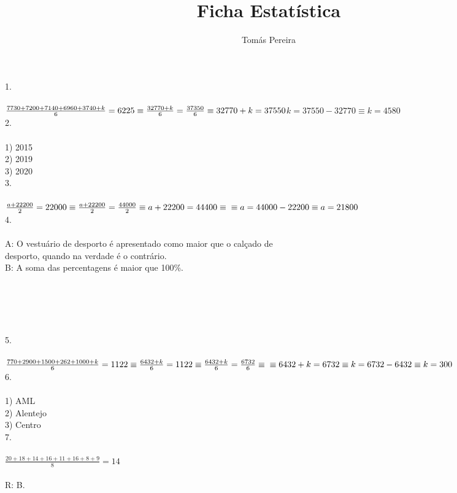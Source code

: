 \documentclass[12pt]{article}
\title{Ficha Estatística}
\author{Tomás Pereira}
\begin{document}
\maketitle

1.\\\\
$\frac{7730+7200+7140+6960+3740+k}{6}=6225\equiv\frac{32770+k}{6}=\frac{37350}{6}\equiv32770+k=37550\\$$k=37550-32770\equiv k=4580$\\

2.\\\\
1) 2015\\
2) 2019\\
3) 2020\\

3.\\\\
$\frac{a+22200}{2}=22000\equiv\frac{a+22200}{2}=\frac{44000}{2}\equiv a+22200=44400\equiv\\ \equiv a=44000-22200\equiv a=21800$\\

4.\\\\
A: O vestuário de desporto é apresentado como maior que o calçado de\\desporto, quando na verdade é o contrário.\\
B: A soma das percentagens é maior que 100\%.\\\\\\\\\\\\

5.\\\\
$\frac{770+2900+1500+262+1000+k}{6}=1122\equiv\frac{6432+k}{6}=1122\equiv\frac{6432+k}{6}=\frac{6732}{6}\equiv\\\equiv6432+k=6732\equiv k=6732-6432\equiv k=300$\\

6.\\\\
1) AML\\
2) Alentejo\\
3) Centro\\

7.\\\\
$\frac{20+18+14+16+11+16+8+9}{8}=14$\\\\
R: B.\\
\end{document}
